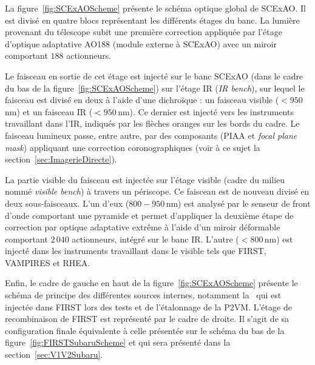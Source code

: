 La figure~\ref{fig:SCExAOScheme} présente le schéma optique global de \ac{SCExAO}. Il est divisé en quatre blocs représentant les différents étages du banc. La lumière provenant du télescope subit une première correction appliquée par l'étage d'optique adaptative AO188 \citep{minowa2010} (module externe à \ac{SCExAO}) avec un miroir comportant $188$ actionneurs.

Le faisceau en sortie de cet étage est injecté sur le banc \ac{SCExAO} (dans le cadre du bas de la figure~\ref{fig:SCExAOScheme}) sur l'étage \ac{IR} (\textit{IR bench}), sur lequel le faisceau est divisé en deux à l'aide d'une dichroïque : un faisceau visible ($< 950 \,$nm) et un faisceau \ac{IR} ($< 950 \,$nm). Ce dernier est injecté vers les instruments travaillant dans l'\ac{IR}, indiqués par les flèches oranges sur les bords du cadre. Le faisceau lumineux passe, entre autre, par des composants (\ac{PIAA} et \textit{focal plane mask}) appliquant une correction coronographiques (voir à ce sujet la section~\ref{sec:ImagerieDirecte}).

La partie visible du faisceau est injectée sur l'étage visible (cadre du milieu nommé \textit{visible bench}) à travers un périscope. Ce faisceau est de nouveau divisé en deux sous-faisceaux. L'un d'eux ($800 - 950 \,$nm) est analysé par le senseur de front d'onde comportant une pyramide \citep{lozi2019} et permet d'appliquer la deuxième étape de correction par optique adaptative extrême à l'aide d'un miroir déformable comportant $2\,040$ actionneurs, intégré sur le banc \ac{IR}. L'autre ($< 800 \,$nm) est injecté dans les instruments travaillant dans le visible tels que \ac{FIRST}, \ac{VAMPIRES} et \ac{RHEA}.

Enfin, le cadre de gauche en haut de la figure~\ref{fig:SCExAOScheme} présente le schéma de principe des différentes sources internes, notamment la \sk~qui est injectée dans \ac{FIRST} lors des tests et de l'étalonnage de la \ac{P2VM}. L'étage de recombinaison de \ac{FIRST} est représenté par le cadre de droite. Il s'agit de sa configuration finale équivalente à celle présentée sur le schéma du bas de la figure~\ref{fig:FIRSTSubaruScheme} et qui sera présenté dans la section~\ref{sec:V1V2Subaru}.

